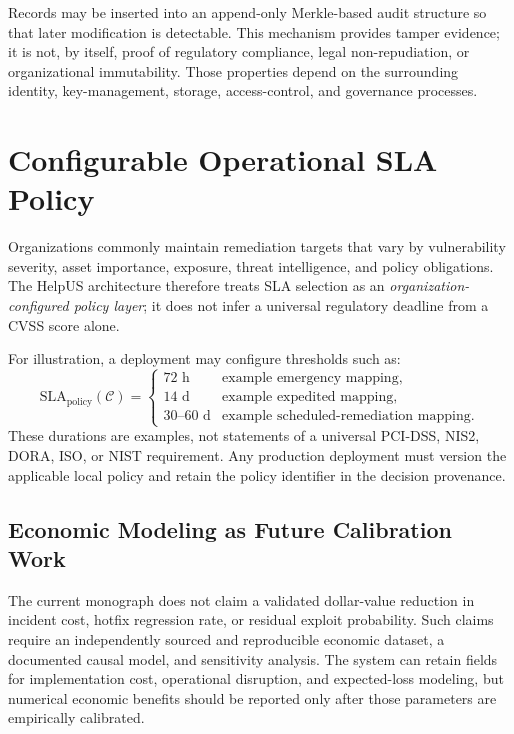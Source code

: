 Records may be inserted into an append-only Merkle-based audit structure so that later modification is detectable. This mechanism provides tamper evidence; it is not, by itself, proof of regulatory compliance, legal non-repudiation, or organizational immutability. Those properties depend on the surrounding identity, key-management, storage, access-control, and governance processes.

\section{Configurable Operational SLA Policy}
\label{sec:sla_economics}
Organizations commonly maintain remediation targets that vary by vulnerability severity, asset importance, exposure, threat intelligence, and policy obligations. The HelpUS architecture therefore treats SLA selection as an \emph{organization-configured policy layer}; it does not infer a universal regulatory deadline from a CVSS score alone.

For illustration, a deployment may configure thresholds such as:
\begin{equation}
    \text{SLA}_{\text{policy}}(\mathcal{C}) =
    \begin{cases}
        72 \text{ h} & \text{example emergency mapping}, \\
        14 \text{ d} & \text{example expedited mapping}, \\
        30\text{--}60 \text{ d} & \text{example scheduled-remediation mapping}.
    \end{cases}
\end{equation}
These durations are examples, not statements of a universal PCI-DSS, NIS2, DORA, ISO, or NIST requirement. Any production deployment must version the applicable local policy and retain the policy identifier in the decision provenance.

\subsection{Economic Modeling as Future Calibration Work}
The current monograph does not claim a validated dollar-value reduction in incident cost, hotfix regression rate, or residual exploit probability. Such claims require an independently sourced and reproducible economic dataset, a documented causal model, and sensitivity analysis. The system can retain fields for implementation cost, operational disruption, and expected-loss modeling, but numerical economic benefits should be reported only after those parameters are empirically calibrated.
